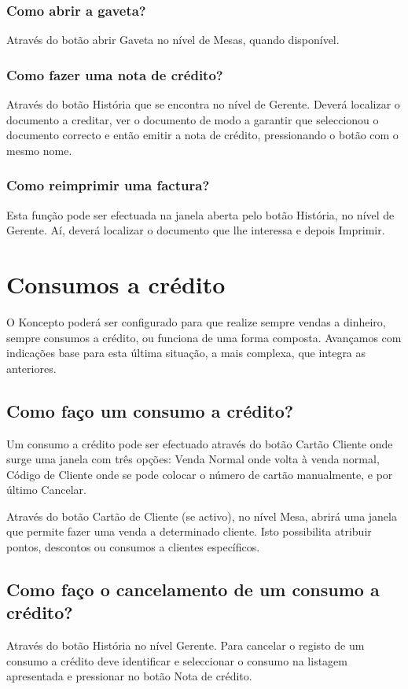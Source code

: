 \documentclass[a4paper,11pt,openany]{memoir}
\begin{document}
\subsection{Como abrir a gaveta?}
Através do botão abrir Gaveta no nível de Mesas, quando disponível.


\subsection{Como fazer uma nota de crédito?}
Através do botão História que se encontra no nível de Gerente. Deverá localizar o
documento a creditar, ver o documento de modo a garantir que seleccionou o
documento correcto e então emitir a nota de crédito, pressionando o botão com o
mesmo nome.

\subsection{Como reimprimir uma factura?}
Esta função pode ser efectuada na janela aberta pelo botão História, no nível de
Gerente. Aí, deverá localizar o documento que lhe interessa e depois Imprimir.




\chapter{Consumos a crédito}

O Koncepto poderá ser configurado para que realize sempre vendas a dinheiro,
sempre consumos a crédito, ou funciona de uma forma composta. Avançamos com
indicações base para esta última situação, a mais complexa, que integra as
anteriores.

\section{Como faço um consumo a crédito?}
Um consumo a crédito pode ser efectuado através do botão Cartão Cliente onde
surge uma janela com três opções: Venda Normal onde volta à venda normal,
Código de Cliente onde se pode colocar o número de cartão manualmente, e por
último Cancelar.

Através do botão Cartão de Cliente (se activo), no nível Mesa, abrirá uma janela que
permite fazer uma venda a determinado cliente. Isto possibilita atribuir pontos,
descontos ou consumos a clientes específicos.

\section{Como faço o cancelamento de um consumo a crédito?}
Através do botão História no nível Gerente. Para cancelar o registo de um consumo
a crédito deve identificar e seleccionar o consumo na listagem apresentada e
pressionar no botão Nota de crédito.
\end{document}
